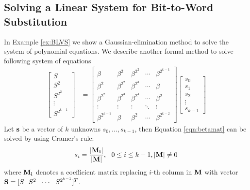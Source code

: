 \subsection{Solving a Linear System for Bit-to-Word Substitution}
In Example \ref{ex:BLVS} we show a Gaussian-elimination method to solve the system of polynomial
equations. We describe another formal method to solve following system of equations
\begin{align}
\label{eqn:betamat}
\begin{bmatrix}
S \\
S^2 \\
S^{2^2} \\
\vdots \\
S^{2^{k-1}}
\end{bmatrix}
&=
\begin{bmatrix}
\beta & \beta^{2} & \beta^{2^2} & \cdots & \beta^{2^{k-1}}\\
\beta^{2} & \beta^{2^2} & \beta^{2^3} & \cdots & \beta \\
\beta^{2^2} & \beta^{2^3} & \beta^{2^4} & \cdots & \beta^2\\
\vdots & \vdots & \vdots & \ddots & \vdots \\
\beta^{2^{k-1}} & \beta & \beta^2 & \cdots & \beta^{2^{k-2}}
\end{bmatrix}
\begin{bmatrix}
s_0\\
s_1\\
s_2\\
\vdots\\
s_{k-1}
\end{bmatrix}
\end{align}
Let ${\bf s}$ be a vector of $k$ unknowns $s_0,\dots,s_{k-1}$,
then Equation \ref{eqn:betamat} can be solved by using Cramer's rule:
\begin{equation}
\label{eqn:Cramer}
s_i = \frac{{|\bf M_i|}}{{|\bf M}|}, \ \ 0\leq i\leq k-1, {|\bf M}| \neq 0
\end{equation}
where ${\bf M_i}$ denotes a coefficient matrix replacing $i$-th column in ${\bf M}$ with
vector ${\bf S} = [S~~S^2~~\cdots~~S^{2^{k-1}}]^T$.

